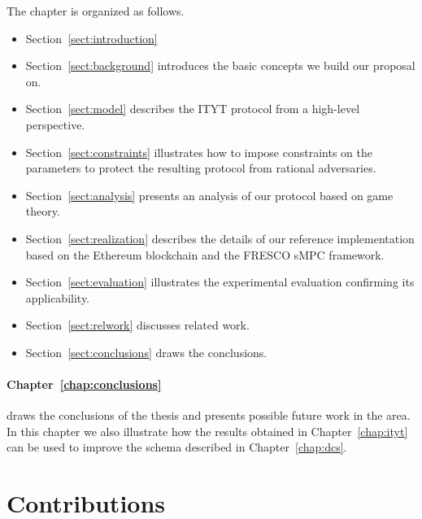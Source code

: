 \smallskip

The chapter is organized as follows.

\begin{itemize}
	
\item Section~\ref{sect:introduction}
	
\item Section~\ref{sect:background} introduces the basic concepts we build our proposal on. 

\item Section~\ref{sect:model} describes the ITYT protocol from a high-level perspective.

\item Section~\ref{sect:constraints} illustrates how to impose constraints on the parameters to protect the resulting protocol from rational adversaries.

\item Section~\ref{sect:analysis} presents an analysis of our protocol based on game theory.

\item Section~\ref{sect:realization} describes the details of our reference implementation based on the Ethereum blockchain and the FRESCO sMPC framework.

\item Section~\ref{sect:evaluation} illustrates the experimental evaluation confirming its applicability.

\item Section~\ref{sect:relwork} discusses related work.

\item Section~\ref{sect:conclusions} draws the conclusions.
\end{itemize}

\medskip

\paragraph*{Chapter~\ref{chap:conclusions}} draws the conclusions of the thesis and presents possible future work in the area. In this chapter we also illustrate how the results obtained in Chapter~\ref{chap:ityt} can be used to improve the schema described in Chapter~\ref{chap:dcs}. 

\bigskip

\section{Contributions}


